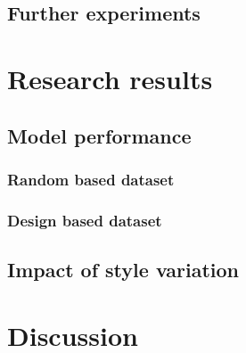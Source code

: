\documentclass[Bachelor, BIC, english, fhCitStyle, IEEE]{BASE/twbook} %
\begin{document}
\section{Further experiments}
\clearpage
\chapter{Research results}
\section{Model performance}
\subsection{Random based dataset}
\subsection{Design based dataset}
\section{Impact of style variation}
\clearpage
\chapter{Discussion}
\clearpage %

\printbib %
\clearpage

\listoffigures %
\clearpage

\listoftables %
\clearpage

\listoflistings %
\clearpage

{}
\end{document}
